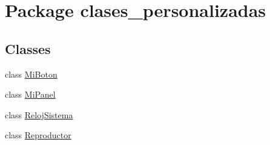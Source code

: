 \hypertarget{namespaceclases__personalizadas}{}\section{Package clases\+\_\+personalizadas}
\label{namespaceclases__personalizadas}
\subsection*{Classes}
\begin{DoxyCompactItemize}
\item 
class \mbox{\hyperlink{classclases__personalizadas_1_1_mi_boton}{Mi\+Boton}}
\item 
class \mbox{\hyperlink{classclases__personalizadas_1_1_mi_panel}{Mi\+Panel}}
\item 
class \mbox{\hyperlink{classclases__personalizadas_1_1_reloj_sistema}{Reloj\+Sistema}}
\item 
class \mbox{\hyperlink{classclases__personalizadas_1_1_reproductor}{Reproductor}}
\end{DoxyCompactItemize}
